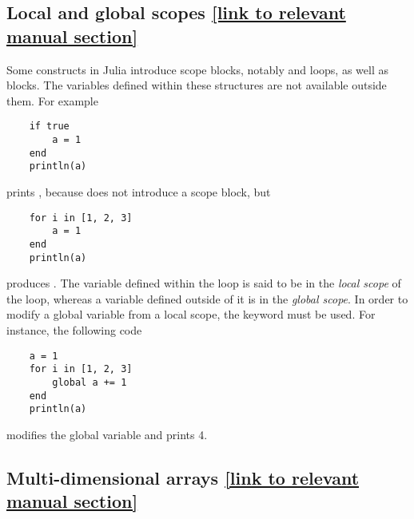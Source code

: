 \subsection*{Local and global scopes {\footnotesize \href{https://docs.julialang.org/en/v1/manual/variables-and-scoping/}{[link to relevant manual section]}}}
Some constructs in Julia introduce scope blocks, notably  and  loops,
as well as  blocks.
The variables defined within these structures are not available outside them.
For example
\begin{verbatim}
    if true
        a = 1
    end
    println(a)
\end{verbatim}
prints ,
because  does not introduce a scope block,
but
\begin{verbatim}
    for i in [1, 2, 3]
        a = 1
    end
    println(a)
\end{verbatim}
produces .
The variable  defined within the  loop is said to be in the \emph{local scope} of the loop,
whereas a variable defined outside of it is in the \emph{global scope}.
In order to modify a global variable from a local scope,
the  keyword must be used.
For instance, the following code
\begin{verbatim}
    a = 1
    for i in [1, 2, 3]
        global a += 1
    end
    println(a)
\end{verbatim}
modifies the global variable  and prints 4.

\subsection*{Multi-dimensional arrays {\footnotesize \href{https://docs.julialang.org/en/v1/manual/arrays/} {[link to relevant manual section]}}}%
\label{sub:multi_dimensional_arrays}

